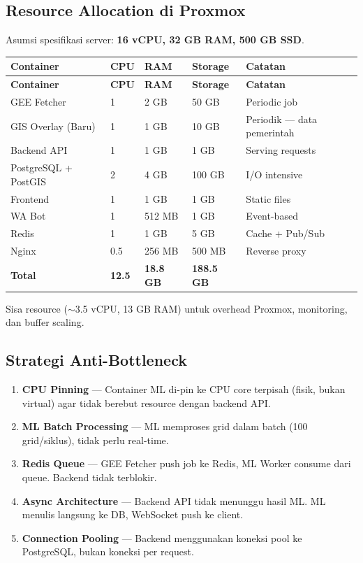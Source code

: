 \documentclass[11pt,a4paper]{article}
\begin{document}
\subsection{Resource Allocation di Proxmox}

Asumsi spesifikasi server: \textbf{16 vCPU, 32 GB RAM, 500 GB SSD}.

\begin{longtable}{p{3cm} p{1.5cm} p{1.5cm} p{2.5cm} p{4.5cm}}
    \toprule
    \textbf{Container} & \textbf{CPU} & \textbf{RAM} & \textbf{Storage} & \textbf{Catatan} \\
    \midrule
    \endfirsthead
    \toprule
    \textbf{Container} & \textbf{CPU} & \textbf{RAM} & \textbf{Storage} & \textbf{Catatan} \\
    \midrule
    \endhead
    \hline
    \endfoot
    \bottomrule
    \endlastfoot

    GEE Fetcher & 1 & 2 GB & 50 GB & Periodic job \\
    GIS Overlay \newline (Baru) & 1 & 1 GB & 10 GB & Periodik — data pemerintah \\
    Backend API & 1 & 1 GB & 1 GB & Serving requests \\
    PostgreSQL + PostGIS & 2 & 4 GB & 100 GB & I/O intensive \\
    Frontend & 1 & 1 GB & 1 GB & Static files \\
    WA Bot & 1 & 512 MB & 1 GB & Event-based \\
    Redis & 1 & 1 GB & 5 GB & Cache + Pub/Sub \\
    Nginx & 0.5 & 256 MB & 500 MB & Reverse proxy \\
    \midrule
    \textbf{Total} & \textbf{12.5} & \textbf{18.8 GB} & \textbf{188.5 GB} & \\
    \bottomrule
\end{longtable}

Sisa resource ($\sim$3.5 vCPU, 13 GB RAM) untuk overhead Proxmox, monitoring, dan buffer scaling.

\subsection{Strategi Anti-Bottleneck}

\begin{enumerate}
    \item \textbf{CPU Pinning} --- Container ML di-pin ke CPU core terpisah (fisik, bukan virtual) agar tidak berebut resource dengan backend API.
    \item \textbf{ML Batch Processing} --- ML memproses grid dalam batch (100 grid/siklus), tidak perlu real-time.
    \item \textbf{Redis Queue} --- GEE Fetcher push job ke Redis, ML Worker consume dari queue. Backend tidak terblokir.
    \item \textbf{Async Architecture} --- Backend API tidak menunggu hasil ML. ML menulis langsung ke DB, WebSocket push ke client.
    \item \textbf{Connection Pooling} --- Backend menggunakan koneksi pool ke PostgreSQL, bukan koneksi per request.
\end{enumerate}
\end{document}
